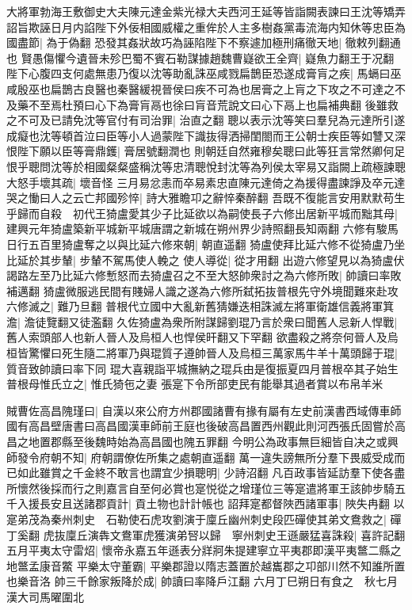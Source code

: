 大將軍勃海王敷御史大夫陳元達金紫光禄大夫西河王延等皆詣闕表諫曰王沈等矯弄詔旨欺誣日月内諂陛下外佞相國威權之重侔於人主多樹姦黨毒流海内知休等忠臣為國盡節|{
	為于偽翻}
恐發其姦狀故巧為誣陷陛下不察遽加極刑痛徹天地|{
	徹敕列翻通也}
賢愚傷懼今遺晉未殄巴蜀不賓石勒謀據趙魏曹嶷欲王全齊|{
	嶷魚力翻王于况翻}
陛下心腹四支何處無患乃復以沈等助亂誅巫咸戮扁鵲臣恐遂成膏肓之疾|{
	馬螎曰巫咸殷巫也扁鵲古良醫也秦醫緩視晉侯曰疾不可為也居膏之上肓之下攻之不可達之不及藥不至焉杜預曰心下為膏肓鬲也徐曰肓音荒說文曰心下鬲上也扁補典翻}
後雖救之不可及已請免沈等官付有司治罪|{
	治直之翻}
聰以表示沈等笑曰羣兒為元達所引遂成癡也沈等頓首泣曰臣等小人過蒙陛下識抜得洒掃閨閤而王公朝士疾臣等如讐又深恨陛下願以臣等膏鼎鑊|{
	膏居號翻潤也}
則朝廷自然雍穆矣聰曰此等狂言常然卿何足恨乎聰問沈等於相國粲粲盛稱沈等忠清聰悅封沈等為列侯太宰易又詣闕上疏極諫聰大怒手壞其疏|{
	壞音怪}
三月易忿恚而卒易素忠直陳元達倚之為援得盡諫諍及卒元達哭之慟曰人之云亡邦國殄悴|{
	詩大雅瞻卭之辭悴秦醉翻}
吾既不復能言安用默默苟生乎歸而自殺　初代王猗盧愛其少子比延欲以為嗣使長子六修出居新平城而黜其母|{
	建興元年猗盧築新平城新平城唐謂之新城在朔州界少詩照翻長知兩翻}
六修有駿馬日行五百里猗盧奪之以與比延六修來朝|{
	朝直遥翻}
猗盧使拜比延六修不從猗盧乃坐比延於其步輦|{
	步輦不駕馬使人輓之}
使人導從|{
	從才用翻}
出遊六修望見以為猗盧伏謁路左至乃比延六修慙怒而去猗盧召之不至大怒帥衆討之為六修所敗|{
	帥讀曰率敗補邁翻}
猗盧微服逃民間有賤婦人識之遂為六修所弑拓抜普根先守外境聞難來赴攻六修滅之|{
	難乃旦翻}
普根代立國中大亂新舊猜嫌迭相誅滅左將軍衛雄信義將軍箕澹|{
	澹徒覽翻又徒濫翻}
久佐猗盧為衆所附謀歸劉琨乃言於衆曰聞舊人忌新人悍戰|{
	舊人索頭部人也新人晉人及烏桓人也悍侯旰翻又下罕翻}
欲盡殺之將奈何晉人及烏桓皆驚懼曰死生隨二將軍乃與琨質子遵帥晉人及烏桓三萬家馬牛羊十萬頭歸于琨|{
	質音致帥讀曰率下同}
琨大喜親詣平城撫納之琨兵由是復振夏四月普根卒其子始生普根母惟氏立之|{
	惟氏猗㐌之妻}
張寔下令所部吏民有能舉其過者賞以布帛羊米

賊曹佐高昌隗瑾曰|{
	自漢以來公府方州郡國諸曹有掾有屬有左史前漢書西域傳車師國有高昌壁唐書曰高昌國漢車師前王庭也後破高昌置西州觀此則河西張氏固嘗於高昌之地置郡縣至後魏時始為高昌國也隗五罪翻}
今明公為政事無巨細皆自决之或興師發令府朝不知|{
	府朝謂僚佐所集之處朝直遥翻}
萬一違失謗無所分羣下畏威受成而已如此雖賞之千金終不敢言也謂宜少損聰明|{
	少詩沼翻}
凡百政事皆延訪羣下使各盡所懷然後採而行之則嘉言自至何必賞也寔悦從之增瑾位三等寔遣將軍王該帥步騎五千入援長安且送諸郡貢計|{
	貢土物也計計帳也}
詔拜寔都督陜西諸軍事|{
	陜失冉翻}
以寔弟茂為秦州刺史　石勒使石虎攻劉演于廩丘幽州刺史段匹磾使其弟文鴦救之|{
	磾丁奚翻}
虎抜廩丘演犇文鴦軍虎獲演弟唘以歸　寧州刺史王遜嚴猛喜誅殺|{
	喜許記翻}
五月平夷太守雷炤|{
	懷帝永嘉五年遜表分牂牁朱提建寧立平夷郡即漢平夷鄨二縣之地鄨孟康音鱉}
平樂太守董霸|{
	平樂郡證以隋志蓋置於越巂郡之卭部川然不知誰所置也樂音洛}
帥三千餘家叛降於成|{
	帥讀曰率降戶江翻}
六月丁巳朔日有食之　秋七月漢大司馬曜圍北

